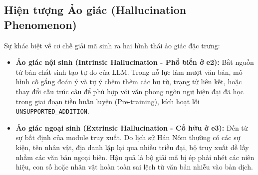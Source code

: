 \subsection{Hiện tượng Ảo giác (Hallucination Phenomenon)}
Sự khác biệt về cơ chế giải mã sinh ra hai hình thái ảo giác đặc trưng:
\begin{itemize}
\item \textbf{Ảo giác nội sinh (Intrinsic Hallucination - Phổ biến ở e2):} Bắt nguồn từ bản chất sinh tạo tự do của LLM. Trong nỗ lực làm mượt văn bản, mô hình cố gắng đoán ý và tự ý chêm thêm các hư từ, trạng từ liên kết, hoặc thay đổi cấu trúc câu để phù hợp với văn phong ngôn ngữ hiện đại đã học trong giai đoạn tiền huấn luyện (Pre-training), kích hoạt lỗi \texttt{UNSUPPORTED\_ADDITION}.
\item \textbf{Ảo giác ngoại sinh (Extrinsic Hallucination - Cố hữu ở e3):} Đến từ sự bất định của module truy xuất. Do lịch sử Hán Nôm thường có các sự kiện, tên nhân vật, địa danh lặp lại qua nhiều triều đại, bộ truy xuất dễ lấy nhầm các văn bản ngoại biên. Hậu quả là bộ giải mã bị ép phải nhét các niên hiệu, con số hoặc nhân vật hoàn toàn sai lệch từ văn bản nhiễu vào bản dịch.
\end{itemize}
